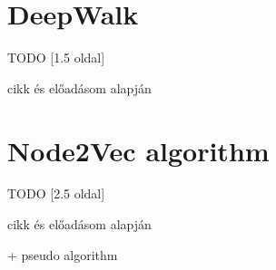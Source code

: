 \section{DeepWalk} 
TODO [1.5 oldal]

cikk és előadásom alapján

\section{Node2Vec algorithm}
TODO [2.5 oldal]

cikk és előadásom alapján

+ pseudo algorithm